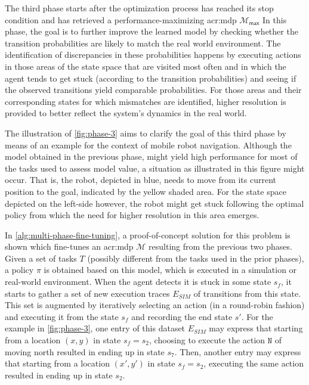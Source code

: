 The third phase starts after the optimization process has reached its stop condition and has retrieved a performance-maximizing \acrshort{acr:mdp} $\mathcal{M}_\mathsf{max}$
In this phase, the goal is to further improve the learned model by checking whether the transition probabilities are likely to match the real world environment.
The identification of discrepancies in these probabilities happens by executing actions in those areas of the state space that are visited most often and in which the agent tends to get stuck (according to the transition probabilities) and seeing if the observed transitions yield comparable probabilities.
For those areas and their corresponding states for which mismatches are identified, higher resolution is provided to better reflect the system's dynamics in the real world.

The illustration of \autoref{fig:phase-3} aims to clarify the goal of this third phase by means of an example for the context of mobile robot navigation.
Although the model obtained in the previous phase, might yield high performance for most of the tasks used to assess model value, a situation as illustrated in this figure might occur.
That is, the robot, depicted in blue, needs to move from its current position to the goal, indicated by the yellow shaded area.
For the state space depicted on the left-side however, the robot might get stuck following the optimal policy from which the need for higher resolution in this area emerges.

In \autoref{alg:multi-phase-fine-tuning}, a proof-of-concept solution for this problem is shown which fine-tunes an \acrshort{acr:mdp} $\mathcal{M}$ resulting from the previous two phases.
Given a set of tasks $T$ (possibly different from the tasks used in the prior phases), a policy $\pi$ is obtained based on this model, which is executed in a simulation or real-world environment.
When the agent detects it is stuck in some state $s_f$, it starts to gather a set of new execution traces $E_\mathit{SIM}$ of transitions from this state.
This set is augmented by iteratively selecting an action (in a round-robin fashion) and executing it from the state $s_f$ and recording the end state $s'$.
For the example in \autoref{fig:phase-3}, one entry of this dataset $E_\mathit{SIM}$ may express that starting from a location $(x, y)$ in state $s_f = s_2$, choosing to execute the action $\texttt{N}$ of moving north resulted in ending up in state $s_7$.
Then, another entry may express that starting from a location $(x', y')$ in state $s_f = s_2$, executing the same action resulted in ending up in state $s_2$.


